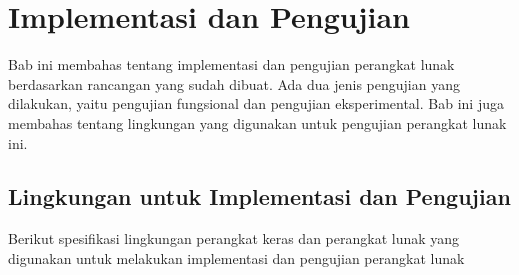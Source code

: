 \chapter{Implementasi dan Pengujian}
\label{chap:implementasi dan pengujian}

Bab ini membahas tentang implementasi dan pengujian perangkat lunak berdasarkan rancangan yang sudah dibuat. Ada dua jenis pengujian yang dilakukan, yaitu pengujian fungsional dan pengujian eksperimental. Bab ini juga membahas tentang lingkungan yang digunakan untuk pengujian perangkat lunak ini.

\section{Lingkungan untuk Implementasi dan Pengujian}
Berikut spesifikasi lingkungan perangkat keras dan perangkat lunak yang digunakan untuk melakukan implementasi dan pengujian perangkat lunak
\begin{table}[H] %
	\caption{Lingkungan Perangkat Keras}
	\label{tab:lingkunganpkpf}
\end{table}

\begin{table}[H] %
	\caption{Lingkungan Perangkat Lunak}
	\label{tab:lingkunganplpf}
\end{table}

